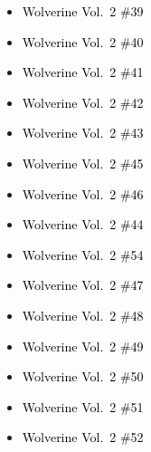 \documentclass[12pt]{article}
\newcommand{\checkbox}{\raisebox{0.0ex}{\fbox{\rule{0ex}{1.5ex} \rule{1.5ex}{0ex}}}}
\begin{document}
\vspace{0.3cm}
\noindent
\begin{tcolorbox}[
  colback=white!95!gray,
  colframe=black,
  width=\textwidth,
  arc=4mm,
  auto outer arc,
  boxrule=0.8pt,
  left=8pt,right=8pt,top=8pt,bottom=8pt
]
\begin{itemize}[left=0pt,label={\checkbox}]
  \item \textcolor{black}{Wolverine Vol.\ 2 \#39}
  \item \textcolor{black}{Wolverine Vol.\ 2 \#40}
  \item \textcolor{black}{Wolverine Vol.\ 2 \#41}
  \item \textcolor{black}{Wolverine Vol.\ 2 \#42}
  \item \textcolor{black}{Wolverine Vol.\ 2 \#43}
  \item \textcolor{black}{Wolverine Vol.\ 2 \#45}
  \item \textcolor{black}{Wolverine Vol.\ 2 \#46}
  \item \textcolor{black}{Wolverine Vol.\ 2 \#44}
  \item \textcolor{black}{Wolverine Vol.\ 2 \#54}
  \item \textcolor{black}{Wolverine Vol.\ 2 \#47}
  \item \textcolor{black}{Wolverine Vol.\ 2 \#48}
  \item \textcolor{black}{Wolverine Vol.\ 2 \#49}
  \item \textcolor{black}{Wolverine Vol.\ 2 \#50}
  \item \textcolor{black}{Wolverine Vol.\ 2 \#51}
  \item \textcolor{black}{Wolverine Vol.\ 2 \#52}
\end{itemize}
\end{tcolorbox}

\end{document}
